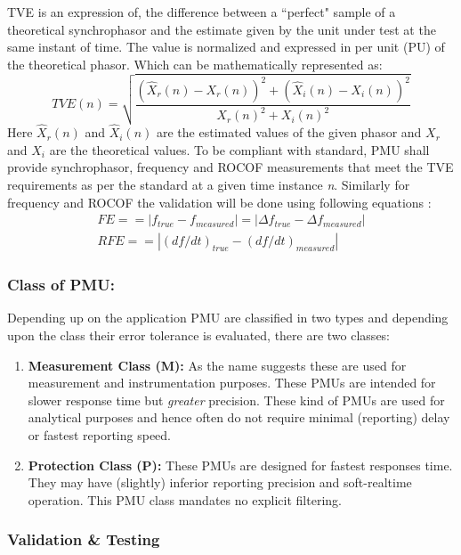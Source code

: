 TVE is an expression of, the difference between a ``perfect" sample of a theoretical synchrophasor and the estimate given by the unit under test at the same instant of time. The value is normalized and expressed in per unit (PU) of the theoretical phasor. Which can be mathematically represented as: 
\begin{equation}
TVE(n) = \sqrt{\frac{ (\hat{X}_r(n) - X_r(n))^2 + (\hat{X}_i(n)-X_i(n))^2} {X_r(n)^2 + X_i(n)^2}}
\end{equation}
Here $ \hat{X}_r (n)$ and $\hat{X}_i(n) $ are the estimated values of the given phasor and $X_r$ and $X_i$ are the theoretical values.
To be compliant with standard, PMU shall provide synchrophasor, frequency and ROCOF measurements that meet the TVE requirements as per the standard at a given time instance \textit{n}. Similarly for frequency and ROCOF the validation will be done using following equations \cite{c37.118}:
\begin{eqnarray}
FE == |f_{true}-f_{measured}| = |\Delta f_{true}-\Delta f_{measured}| \\
RFE == |(df/dt)_{true}-(df/dt)_{measured} |
\end{eqnarray}

\subsubsection{Class of PMU:}
Depending up on the application PMU are classified in two types and depending upon the class their error tolerance is evaluated, there are two classes:
\begin{enumerate}
	\item \textbf{Measurement Class (M):} As the name suggests these are used for measurement and instrumentation purposes. These PMUs are intended for slower response time but \textit{greater} precision. These kind of PMUs are used for analytical purposes and hence often do not require minimal (reporting) delay or fastest reporting speed.
	\item \textbf{Protection Class (P):} These PMUs are designed for fastest responses time. They may have (slightly) inferior reporting precision and soft-realtime operation. This PMU class mandates no explicit filtering.
\end{enumerate} 

\subsubsection{Validation \& Testing }

